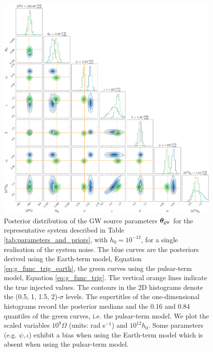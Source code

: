 \documentclass[fleqn,usenatbib,useAMS]{mnras}
\begin{document}
	\begin{figure}
	\includegraphics[width=\textwidth, height =\textwidth ]{images/corner_highSNR_compare}
	\caption{Posterior distribution of the GW source parameters $\boldsymbol{\theta}_{\rm gw}$ for the representative system described in Table \ref{tab:parameters_and_priors}, with $h_0 = 10^{-12}$, for a single realisation of the system noise. The blue curves are the posteriors derived using the Earth-term model, Equation \eqref{eq:g_func_trig_earth}, the green curves using the pulsar-term model, Equation \eqref{eq:g_func_trig}. The vertical orange lines indicate the true injected values. The contours in the 2D histograms denote the (0.5, 1, 1.5, 2)-$\sigma$ levels. The supertitles of the one-dimensional histograms record the posterior medians and the 0.16 and 0.84 quantiles of the green curves, i.e. the pulsar-term model. We plot the scaled variables $10^9 \Omega$ (units: rad s$^{-1}$) and $10^{12} h_0$. Some parameters (e.g. $\psi, \iota$) exhibit a bias when using the Earth-term model which is absent when using the pulsar-term model.}
	\label{fig:corner_plot_compare_high}
\end{figure}
\end{document}
